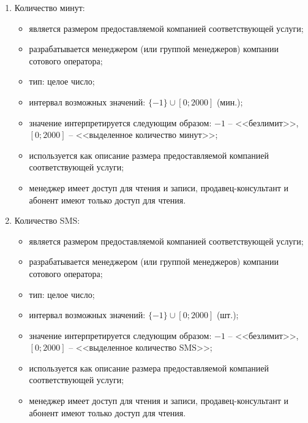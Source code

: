 \begin{enumerate}
\begin{enumerate}
        \item Количество минут:
        \begin{itemize}
            \item является размером предоставляемой компанией соответствующей услуги;
            \item разрабатывается менеджером (или группой менеджеров) компании сотового оператора;
            \item тип: целое число;
            \item интервал возможных значений: $\{-1\} \cup [0; 2 000]$ (мин.); %
            \item значение интерпретируется следующим образом: $-1$ -- <<безлимит>>, $[0; 2 000]$ -- <<выделенное количество минут>>;
            \item используется как описание размера предоставляемой компанией соответствующей услуги;
            \item менеджер имеет доступ для чтения и записи, продавец-консультант и абонент имеют только доступ для чтения.
        \end{itemize}

        \item Количество SMS:
        \begin{itemize}
            \item является размером предоставляемой компанией соответствующей услуги;
            \item разрабатывается менеджером (или группой менеджеров) компании сотового оператора;
            \item тип: целое число;
            \item интервал возможных значений: $\{-1\} \cup [0; 2 000]$ (шт.); %
            \item значение интерпретируется следующим образом: $-1$ -- <<безлимит>>, $[0; 2 000]$ -- <<выделенное количество SMS>>;
            \item используется как описание размера предоставляемой компанией соответствующей услуги;
            \item менеджер имеет доступ для чтения и записи, продавец-консультант и абонент имеют только доступ для чтения.
        \end{itemize}
    \end{enumerate}


\end{enumerate}
